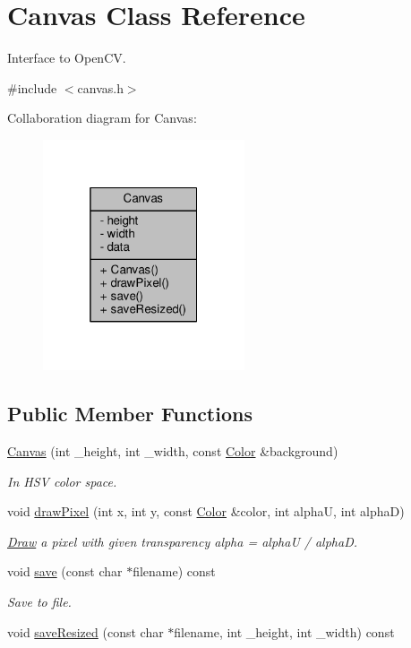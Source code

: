 \hypertarget{classCanvas}{}\section{Canvas Class Reference}
\label{classCanvas}


Interface to Open\+CV.  




{\ttfamily \#include $<$canvas.\+h$>$}



Collaboration diagram for Canvas\+:\nopagebreak
\begin{figure}[H]
\begin{center}
\leavevmode
\includegraphics[width=169pt]{classCanvas__coll__graph}
\end{center}
\end{figure}
\subsection*{Public Member Functions}
\begin{DoxyCompactItemize}
\item 
\hyperlink{classCanvas_a04e5495c637170cd93c20dbcc56b7cce}{Canvas} (int \+\_\+height, int \+\_\+width, const \hyperlink{canvas_8h_a084a39206618848fb8bc9187d3758c87}{Color} \&background)
\begin{DoxyCompactList}\small\item\em In H\+SV color space. \end{DoxyCompactList}\item 
void \hyperlink{classCanvas_a74e163f47b09d23afc273c5024918280}{draw\+Pixel} (int x, int y, const \hyperlink{canvas_8h_a084a39206618848fb8bc9187d3758c87}{Color} \&color, int alphaU, int alphaD)
\begin{DoxyCompactList}\small\item\em \hyperlink{classDraw}{Draw} a pixel with given transparency alpha = alphaU / alphaD. \end{DoxyCompactList}\item 
void \hyperlink{classCanvas_a2fcf1999f81d5cbbb55271b7f3db1565}{save} (const char $\ast$filename) const 
\begin{DoxyCompactList}\small\item\em Save to file. \end{DoxyCompactList}\item 
void \hyperlink{classCanvas_a2d3e01d8ec83c99e36b76f780c1bfa3e}{save\+Resized} (const char $\ast$filename, int \+\_\+height, int \+\_\+width) const 
\end{DoxyCompactItemize}

